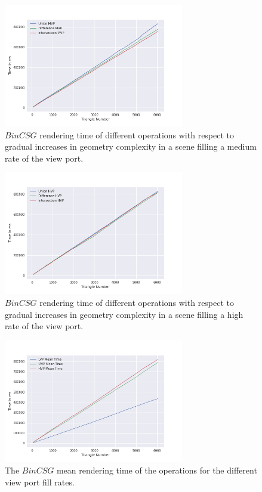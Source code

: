\documentclass[a4paper,11pt,oneside]{article}
\begin{document}
\begin{figure}[H]
	\centering
	\includegraphics[width=0.7\textwidth]{section5/plots/bin_csg_mvp.png}
	\caption{$BinCSG$ rendering time of different operations with respect to gradual increases in geometry complexity in a scene filling a medium rate of the view port.}
	\label{sec5.1:bin_operations_mvp}
\end{figure}

\begin{figure}[H]
	\centering
	\includegraphics[width=0.7\textwidth]{section5/plots/bin_csg_hvp.png}
	\caption{$BinCSG$ rendering time of different operations with respect to gradual increases in geometry complexity in a scene filling a high rate of the view port.}
	\label{sec5.1:bin_operations_hvp}
\end{figure}

\begin{figure}[H]
	\centering
	\includegraphics[width=0.7\textwidth]{section5/plots/bin_csg_mean.png}
	\caption{The $BinCSG$ mean rendering time of the operations for the different view port fill rates.}
	\label{sec5.1:bin_operations}
\end{figure}
\end{document}

